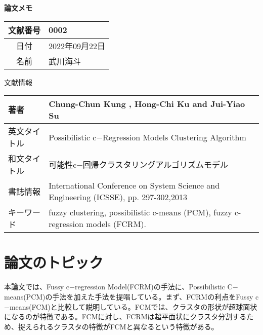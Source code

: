 \documentclass[10pt,onecolumn]{jsarticle}
\begin{document}
\vspace{-20mm}
\begin{center}
{\LARGE\textbf{論文メモ}}
\end{center}

\begin{flushright}
\begin{tabular}{|c|l|}
\hline
文献番号  &  0002
\\
\hline
日付  &  2022年09月22日
\\
\hline
名前  &  武川海斗
\\
\hline
\end{tabular}
\end{flushright}


%
%
\begin{center}
{\large 文献情報}
\begin{table}[hbp]%
\begin{tabular}{|l||l|}
\hline
著者  &  Chung-Chun Kung , Hong-Chi Ku and Jui-Yiao Su
\\ \hline
英文タイトル  & Possibilistic c$-$Regression Models Clustering Algorithm
\\ \hline
和文タイトル  & 可能性c$-$回帰クラスタリングアルゴリズムモデル
\\ \hline
書誌情報  & International Conference on System Science and Engineering (ICSSE),  pp. 297-302,2013
\\ \hline
キーワード & fuzzy clustering, possibilistic c-means (PCM), fuzzy c-regression models (FCRM).
\\ \hline
\end{tabular}
\end{table}
\end{center}


\section{論文のトピック}
本論文では、Fussy c$-$regression Model(FCRM)の手法に、Possibilistic C$-$means(PCM)の手法を加えた手法を提唱している。まず、FCRMの利点をFussy c$-$means(FCM)と比較して説明している。FCMでは、クラスタの形状が超球面状になるのが特徴である。FCMに対し、FCRMは超平面状にクラスタ分割するため、捉えられるクラスタの特徴がFCMと異なるという特徴がある。
\end{document}
